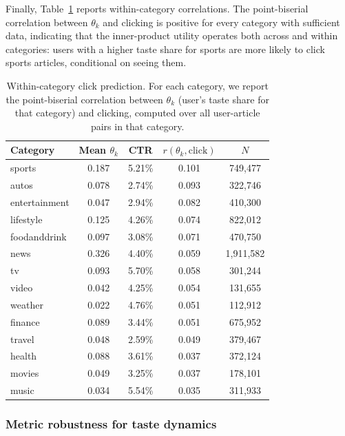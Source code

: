 \documentclass[11pt]{article}
\begin{document}
Finally, Table~\ref{tab:cat_within} reports within-category correlations. The point-biserial correlation between $\theta_k$ and clicking is positive for every category with sufficient data, indicating that the inner-product utility operates both across and within categories: users with a higher taste share for sports are more likely to click sports articles, conditional on seeing them.

\begin{table}[ht]
\centering
\caption{Within-category click prediction. For each category, we report the point-biserial correlation between $\theta_k$ (user's taste share for that category) and clicking, computed over all user-article pairs in that category.}
\label{tab:cat_within}
\begin{tabular}{lcccc}
\toprule
Category & Mean $\theta_k$ & CTR & $r(\theta_k, \text{click})$ & $N$ \\
\midrule
sports & 0.187 & 5.21\% & 0.101 & 749,477 \\
autos & 0.078 & 2.74\% & 0.093 & 322,746 \\
entertainment & 0.047 & 2.94\% & 0.082 & 410,300 \\
lifestyle & 0.125 & 4.26\% & 0.074 & 822,012 \\
foodanddrink & 0.097 & 3.08\% & 0.071 & 470,750 \\
news & 0.326 & 4.40\% & 0.059 & 1,911,582 \\
tv & 0.093 & 5.70\% & 0.058 & 301,244 \\
video & 0.042 & 4.25\% & 0.054 & 131,655 \\
weather & 0.022 & 4.76\% & 0.051 & 112,912 \\
finance & 0.089 & 3.44\% & 0.051 & 675,952 \\
travel & 0.048 & 2.59\% & 0.049 & 379,467 \\
health & 0.088 & 3.61\% & 0.037 & 372,124 \\
movies & 0.049 & 3.25\% & 0.037 & 178,101 \\
music & 0.034 & 5.54\% & 0.035 & 311,933 \\
\bottomrule
\end{tabular}
\end{table}
\FloatBarrier

\subsubsection{Metric robustness for taste dynamics}
\label{sec:metric_robustness}
\end{document}
